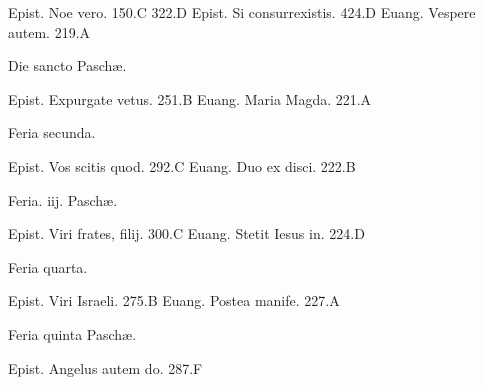 \documentclass[a5paper,10pt]{book}
\def\ae{æ}
\begin{document}
\begin{multicols}{2}
\newline Epist. Noe vero. \hfill 150.C
 \hfill 322.D
\newline Epist. Si consurrexistis. \hfill 424.D
\newline Euang. Vespere autem. \hfill 219.A
\newline \vspace{-1.75em}
\begin{center}
\color{red} Die sancto Pasch\ae .
\end{center}
\vspace{-.75em}
\par \noindent Epist. Expurgate vetus. \hfill 251.B
\newline Euang. Maria Magda. \hfill 221.A
\newline \vspace{-1.75em}
\begin{center}
\color{red} Feria secunda.
\end{center}
\vspace{-.75em}
\par \noindent Epist. Vos scitis quod. \hfill 292.C
\newline Euang. Duo ex disci. \hfill 222.B
\newline \vspace{-1.75em}
\begin{center}
\color{red} Feria. iij. Pasch\ae .
\end{center}
\vspace{-.75em}
\par \noindent Epist. Viri frates, filij. \hfill 300.C
\newline Euang. Stetit Iesus in. \hfill 224.D
\newline \vspace{-1.75em}
\begin{center}
\color{red} Feria quarta.
\end{center}
\vspace{-.75em}
\par \noindent Epist. Viri Israeli. \hfill 275.B
\newline Euang. Postea manife. \hfill 227.A
\newline \vspace{-1.75em}
\begin{center}
\color{red} Feria quinta Pasch\ae .
\end{center}
\vspace{-.75em}
\par \noindent Epist. Angelus autem do. \hfill 287.F

\end{multicols}
\end{document}
